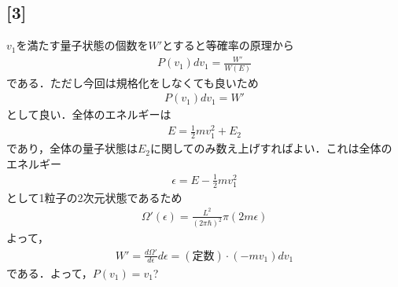 \documentclass[12pt,dvipdfmx]{jsarticle}
\begin{document}
\subsection*{\large{[3]}}
$v_1$を満たす量子状態の個数を$W'$とすると等確率の原理から
\begin{eqnarray}
  P(v_1)dv_1 = \frac{W'}{W(E)}
\end{eqnarray}
である．ただし今回は規格化をしなくても良いため
\begin{eqnarray}
  P(v_1)dv_1 = W'
\end{eqnarray}
として良い．全体のエネルギーは
\begin{eqnarray}
  E = \frac{1}{2}mv_1^2 + E_2
\end{eqnarray}
であり，全体の量子状態は$E_2$に関してのみ数え上げすればよい．これは全体のエネルギー
\begin{eqnarray}
  \epsilon = E-\frac{1}{2}mv_1^2
\end{eqnarray}
として1粒子の2次元状態であるため
\begin{eqnarray}
  \Omega'(\epsilon) = \frac{L^2}{(2\pi\hbar)^2}\pi(2m\epsilon)
\end{eqnarray}
よって，
\begin{eqnarray}
  W' = \frac{d\Omega'}{d\epsilon}d\epsilon = (定数)\cdot (-mv_1)dv_1
\end{eqnarray}
である．よって，$P(v_1)= v_1$?
\end{document}
